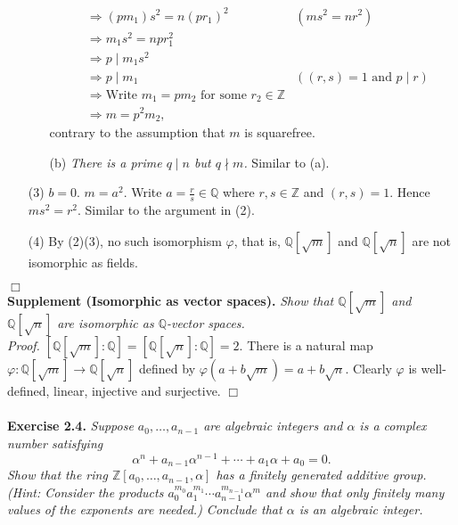 \documentclass{article}
\begin{document}
\begin{enumerate}
\begin{enumerate}
\begin{align*}
  &\Longrightarrow
  (pm_1)s^2 = n(pr_1)^2
    &(ms^2 = nr^2) \\
  &\Longrightarrow
  m_1s^2 = npr_1^2 \\
  &\Longrightarrow
  p \mid m_1s^2 \\
  &\Longrightarrow
  p \mid m_1
    &(\text{$(r,s)=1$ and $p \mid r$}) \\
  &\Longrightarrow
  \text{Write $m_1 = pm_2$ for some $r_2 \in \mathbb{Z}$} \\
  &\Longrightarrow
  m = p^2m_2,
  \end{align*}
  contrary to the assumption that $m$ is squarefree.
  \item[(b)]
  \emph{There is a prime $q \mid n$ but $q \nmid m$.}
  Similar to (a).
  \end{enumerate}
\item[(3)]
$b = 0$.
$m = a^2$.
Write $a = \frac{r}{s} \in \mathbb{Q}$ where $r, s \in \mathbb{Z}$ and $(r, s) = 1$.
Hence $ms^2 = r^2$.
Similar to the argument in (2).
\item[(4)]
By (2)(3), no such isomorphism $\varphi$, that is,
$\mathbb{Q}[\sqrt{m}]$ and $\mathbb{Q}[\sqrt{n}]$
are not isomorphic as fields.
\end{enumerate}
$\Box$ \\



\textbf{Supplement (Isomorphic as vector spaces).}
\emph{Show that $\mathbb{Q}[\sqrt{m}]$ and $\mathbb{Q}[\sqrt{n}]$
are isomorphic as $\mathbb{Q}$-vector spaces.} \\

\emph{Proof.}
$[\mathbb{Q}[\sqrt{m}]:\mathbb{Q}] = [\mathbb{Q}[\sqrt{n}]:\mathbb{Q}] = 2$.
There is a natural map $\varphi: \mathbb{Q}[\sqrt{m}] \to \mathbb{Q}[\sqrt{n}]$
defined by $\varphi(a + b\sqrt{m}) = a + b\sqrt{n}$.
Clearly $\varphi$ is well-defined, linear, injective and surjective.
$\Box$ \\\\






\textbf{Exercise 2.4.}
\emph{Suppose $a_0, \ldots, a_{n-1}$ are algebraic integers and
$\alpha$ is a complex number satisfying
$$\alpha^n + a_{n-1} \alpha^{n-1} + \cdots + a_1 \alpha + a_0 = 0.$$
Show that the ring
$\mathbb{Z}[a_0, \ldots, a_{n-1}, \alpha]$ has a finitely generated additive group.
(Hint: Consider the products $a_0^{m_0} a_1^{m_1} \cdots a_{n-1}^{m_{n-1}} \alpha^m$
and show that only finitely many values of the exponents are needed.)
Conclude that $\alpha$ is an algebraic integer.} \\
\end{document}

